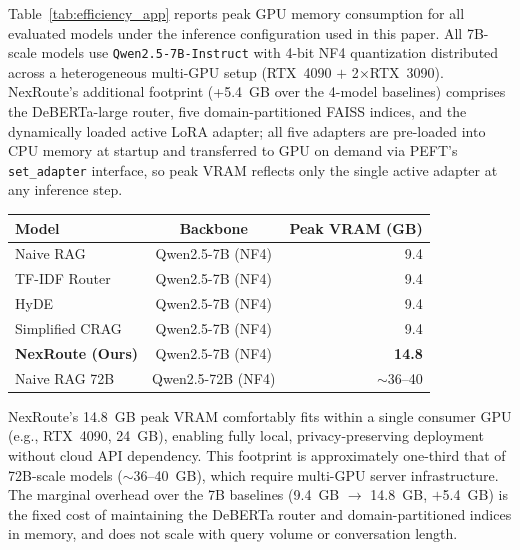 \documentclass[a4paper,fleql,doubleblind]{cas-sc}
\begin{document}
Table~\ref{tab:efficiency_app} reports peak GPU memory consumption for all
evaluated models under the inference configuration used in this paper. All
7B-scale models use \texttt{Qwen2.5-7B-Instruct} with 4-bit NF4 quantization
distributed across a heterogeneous multi-GPU setup (RTX~4090 $+$
2$\times$RTX~3090). NexRoute's additional footprint (+5.4~GB over the
4-model baselines) comprises the DeBERTa-large router, five
domain-partitioned FAISS indices, and the dynamically loaded active LoRA
adapter; all five adapters are pre-loaded into CPU memory at startup and
transferred to GPU on demand via PEFT's \texttt{set\_adapter} interface,
so peak VRAM reflects only the single active adapter at any inference step.

\vspace{6pt plus 4pt minus 3pt}
\begin{center}
\begingroup
{}
\label{tab:efficiency_app}
\renewcommand{\arraystretch}{1.3}
\begin{tabular}{lcr}
\toprule
\textbf{Model} & \textbf{Backbone} & \textbf{Peak VRAM (GB)} \\
\midrule
Naive RAG        & Qwen2.5-7B (NF4) &  9.4 \\
TF-IDF Router     & Qwen2.5-7B (NF4) &  9.4 \\
HyDE             & Qwen2.5-7B (NF4) &  9.4 \\
Simplified CRAG             & Qwen2.5-7B (NF4) &  9.4 \\
\midrule
\textbf{NexRoute (Ours)} & Qwen2.5-7B (NF4) & \textbf{14.8} \\
\midrule
Naive RAG 72B    & Qwen2.5-72B (NF4) & $\sim$36--40 \\
\bottomrule
\end{tabular}
\endgroup
\end{center}
\vspace{6pt plus 4pt minus 3pt}

NexRoute's 14.8~GB peak VRAM comfortably fits within a single consumer
GPU (e.g., RTX~4090, 24~GB), enabling fully local, privacy-preserving
deployment without cloud API dependency. This footprint is approximately
one-third that of 72B-scale models ($\sim$36--40~GB), which require
multi-GPU server infrastructure. The marginal overhead over the 7B
baselines (9.4~GB $\to$ 14.8~GB, $+$5.4~GB) is the fixed cost of
maintaining the DeBERTa router and domain-partitioned indices in memory,
and does not scale with query volume or conversation length.
\end{document}
